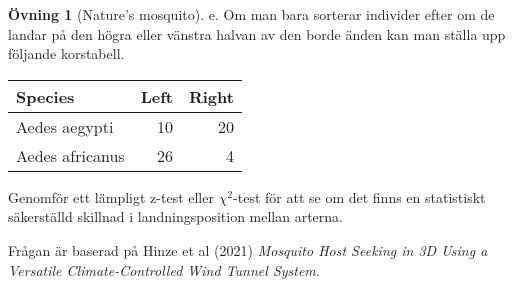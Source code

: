 \documentclass[
]{book}
\theoremstyle{definition}
\theoremstyle{definition}
\theoremstyle{definition}
\newtheorem{exercise}{Övning}[chapter]
\theoremstyle{definition}
\theoremstyle{remark}
\begin{document}
\begin{exercise}[Nature's mosquito]
e. Om man bara sorterar individer efter om de landar på den högra eller vänstra halvan av den borde änden kan man ställa upp följande korstabell.

\begin{table}
\centering
\begin{tabular}[t]{lrr}
\toprule
Species & Left & Right\\
\midrule
Aedes aegypti & 10 & 20\\
Aedes africanus & 26 & 4\\
\bottomrule
\end{tabular}
\end{table}

Genomför ett lämpligt z-test eller \(\chi^2\)-test för att se om det finns en statistiskt säkerställd skillnad i landningsposition mellan arterna.

Frågan är baserad på Hinze et al (2021) \emph{Mosquito Host Seeking in 3D Using a Versatile Climate-Controlled Wind Tunnel System}.
\end{exercise}
\end{document}
